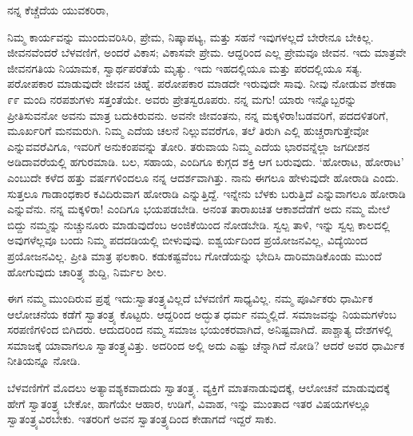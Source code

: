 \noindent
ನನ್ನ ಕೆಚ್ಚೆದೆಯ ಯುವಕರಿರಾ,

ನಿಮ್ಮ ಕಾರ್ಯವನ್ನು ಮುಂದುವರಿಸಿರಿ, ಪ್ರೇಮ, ನಿಷ್ಕಾಪಟ್ಯ, ಮತ್ತು ಸಹನೆ ಇವುಗಳಲ್ಲದೆ ಬೇರೇನೂ ಬೇಕಿಲ್ಲ. ಜೀವನವೆಂದರೆ ಬೆಳವಣಿಗೆ, ಅಂದರೆ ವಿಕಾಸ; ವಿಕಾಸವೇ ಪ್ರೇಮ. ಆದ್ದರಿಂದ ಎಲ್ಲ ಪ್ರೇಮವೂ ಜೀವನ. ಇದು ಮಾತ್ರವೇ ಜೀವನಗತಿಯ ನಿಯಾಮಕ, ಸ್ವಾರ್ಥಪರತೆಯೆ ಮೃತ್ಯು. ಇದು ಇಹದಲ್ಲಿಯೂ ಮತ್ತು ಪರದಲ್ಲಿಯೂ ಸತ್ಯ. ಪರೋಪಕಾರ ಮಾಡುವುದೇ ಜೀವನ ಚಿಹ್ನೆ. ಪರೋಪಕಾರ ಮಾಡದೇ ಇರುವುದೇ ಸಾವು. ನೀವು ನೋಡುವ ಶೇಕಡಾ ೯೯ ಮಂದಿ ನರಪಶುಗಳು ಸತ್ತಂತೆಯೇ. ಅವರು ಪ್ರೇತಸ್ವರೂಪರು. ನನ್ನ ಮಗು! ಯಾರು ಇನ್ನೊಬ್ಬರನ್ನು ಪ್ರೀತಿಸುವನೋ ಅವನು ಮಾತ್ರ ಬದುಕಿರುವನು. ಅವನೇ ಜೀವಂತನು, ನನ್ನ ಮಕ್ಕಳಿರಾ!ಬಡವರಿಗೆ, ಪದದಳಿತರಿಗೆ, ಮೂರ್ಖರಿಗೆ ಮನಮರುಗಿ. ನಿಮ್ಮ ಎದೆಯ ಚಲನೆ ನಿಲ್ಲುವವರೆಗೂ, ತಲೆ ತಿರುಗಿ ಎಲ್ಲಿ ಹುಚ್ಚರಾಗುತ್ತೇವೋ ಎನ್ನುವವರೆವಿಗೂ, ಇವರಿಗೆ ಅನುಕಂಪವನ್ನು ತೋರಿ. ತರುವಾಯ ನಿಮ್ಮ ಎದೆಯ ಭಾರವನ್ನೆಲ್ಲಾ ಜಗದೀಶನ ಅಡಿದಾವರೆಯಲ್ಲಿ ಹಗುರಮಾಡಿ. ಬಲ, ಸಹಾಯ, ಎಂದಿಗೂ ಕುಗ್ಗದ ಶಕ್ತಿ ಆಗ ಬರುವುದು. `ಹೋರಾಟ, ಹೋರಾಟ' ಎಂಬುದೇ ಕಳೆದ ಹತ್ತು ವರ್ಷಗಳಿಂದಲೂ ನನ್ನ ಆದರ್ಶವಾಗಿತ್ತು. ನಾನು ಈಗಲೂ ಹೇಳುವುದೇ ಹೋರಾಡಿ ಎಂದು. ಸುತ್ತಲೂ ಗಾಡಾಂಧಕಾರ ಕವಿದಿರುವಾಗ ಹೋರಾಡಿ ಎನ್ನುತ್ತಿದ್ದೆ. ಇನ್ನೇನು ಬೆಳಕು ಬರುತ್ತಿದೆ ಎನ್ನುವಾಗಲೂ ಹೋರಾಡಿ ಎನ್ನುವೆನು. ನನ್ನ ಮಕ್ಕಳಿರಾ! ಎಂದಿಗೂ ಭಯಪಡಬೇಡಿ. ಅನಂತ ತಾರಾಖಚಿತ ಆಕಾಶದೆಡೆಗೆ ಅದು ನಮ್ಮ ಮೇಲೆ ಬಿದ್ದು ನಮ್ಮನ್ನು ನುಚ್ಚುನೂರು ಮಾಡುವುದೆಂಬ ಅಂಜಿಕೆಯಿಂದ ನೋಡಬೇಡಿ. ಸ್ವಲ್ಪ ತಾಳಿ, ಇನ್ನು ಸ್ವಲ್ಪ ಕಾಲದಲ್ಲಿ ಅವುಗಳೆಲ್ಲವೂ ಬಂದು ನಿಮ್ಮ ಪದದಡಿಯಲ್ಲಿ ಬೀಳುವುವು. ಐಶ್ವರ್ಯದಿಂದ ಪ್ರಯೋಜನವಿಲ್ಲ, ವಿದ್ಯೆಯಿಂದ ಪ್ರಯೋಜನವಿಲ್ಲ. ಪ್ರೀತಿ ಮಾತ್ರ ಫಲಕಾರಿ. ಕಡುಕಷ್ಟವೆಂಬ ಗೋಡೆಯನ್ನು ಭೇದಿಸಿ ದಾರಿಮಾಡಿಕೊಂಡು ಮುಂದೆ ಹೋಗುವುದು ಚಾರಿತ್ರ್ಯ ಶುದ್ದಿ, ನಿರ್ಮಲ ಶೀಲ.

ಈಗ ನಮ್ಮ ಮುಂದಿರುವ ಪ್ರಶ್ನೆ ಇದು:ಸ್ವಾತಂತ್ರ್ಯವಿಲ್ಲದೆ ಬೆಳವಣಿಗೆ ಸಾಧ್ಯವಿಲ್ಲ. ನಮ್ಮ ಪೂರ್ವಿಕರು ಧಾರ್ಮಿಕ ಆಲೋಚನೆಯ ಕಡೆಗೆ ಸ್ವಾತಂತ್ರ್ಯ ಕೊಟ್ಟರು. ಆದ್ದರಿಂದ ಅದ್ಭುತ ಧರ್ಮ ನಮ್ಮಲ್ಲಿದೆ. ಸಮಾಜವನ್ನು ನಿಯಮಗಳೆಂಬ ಸರಪಣಿಗಳಿಂದ ಬಿಗಿದರು. ಆದುದರಿಂದ ನಮ್ಮ ಸಮಾಜ ಭಯಂಕರವಾಗಿದೆ, ಅನಿಷ್ಟವಾಗಿದೆ. ಪಾಶ್ಚಾತ್ಯ ದೇಶಗಳಲ್ಲಿ ಸಮಾಜಕ್ಕೆ ಯಾವಾಗಲೂ ಸ್ವಾತಂತ್ರ್ಯವಿತ್ತು. ಅದರಿಂದ ಅಲ್ಲಿ ಅದು ಎಷ್ಟು ಚೆನ್ನಾಗಿದೆ ನೋಡಿ? ಆದರೆ ಅವರ ಧಾರ್ಮಿಕ ನೀತಿಯನ್ನೂ ನೋಡಿ.

ಬೆಳವಣಿಗೆಗೆ ಮೊದಲು ಅತ್ಯಾವಶ್ಯಕವಾದುದು ಸ್ವಾತಂತ್ರ್ಯ. ವ್ಯಕ್ತಿಗೆ ಮಾತನಾಡುವುದಕ್ಕೆ, ಆಲೋಚನೆ ಮಾಡುವುದಕ್ಕೆ ಹೇಗೆ ಸ್ವಾತಂತ್ರ್ಯ ಬೇಕೋ, ಹಾಗೆಯೇ ಆಹಾರ, ಉಡಿಗೆ, ವಿವಾಹ, ಇನ್ನು ಮುಂತಾದ ಇತರ ವಿಷಯಗಳಲ್ಲೂ ಸ್ವಾತಂತ್ರ್ಯವಿರಬೇಕು. ಇತರರಿಗೆ ಅವನ ಸ್ವಾತಂತ್ರ್ಯದಿಂದ ಕೇಡಾಗದೆ ಇದ್ದರೆ ಸಾಕು.

